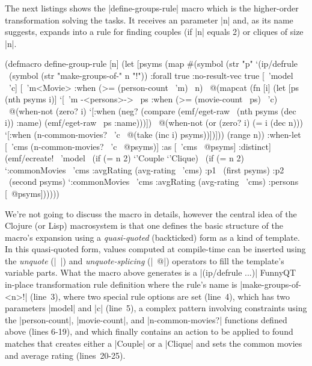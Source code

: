 \documentclass[submission]{eptcs}
\newcommand{\code}{\clojureinline}
\begin{document}
The next listings shows the \code|define-groups-rule| macro which is the
higher-order transformation solving the tasks.  It receives an parameter
\code|n| and, as its name suggests, expands into a rule for finding couples (if
\code|n| equals 2) or cliques of size \code|n|.

\begin{clojurecode}
(defmacro define-group-rule [n]
  (let [psyms (map #(symbol (str "p" %
    `(ip/defrule ~(symbol (str "make-groups-of-" n "!"))
       {:forall true :no-result-vec true}
       [~'model ~'c]
       [~'m<Movie> :when (>= (person-count ~'m) ~n)
        ~@(mapcat (fn [i]
                    (let [ps (nth psyms i)]
                      `[~'m -<persons>-> ~ps
                        :when (>= (movie-count ~ps) ~'c)
                        ~@(when-not (zero? i)
                            `[:when (neg? (compare (emf/eget-raw ~(nth psyms (dec i)) :name)
                                                   (emf/eget-raw ~ps :name)))])
                        ~@(when-not (or (zero? i) (= i (dec n)))
                            `[:when (n-common-movies? ~'c ~@(take (inc i) psyms))])]))
                  (range n))
        :when-let [~'cms (n-common-movies? ~'c ~@psyms)]
        :as [~'cms ~@psyms]
        :distinct]
       (emf/ecreate! ~'model ~(if (= n 2) `'Couple `'Clique)
                     ~(if (= n 2)
                        `{:commonMovies ~'cms :avgRating (avg-rating ~'cms)
                          :p1 ~(first psyms) :p2 ~(second psyms)}
                        `{:commonMovies ~'cms :avgRating (avg-rating ~'cms)
                          :persons [~@psyms]})))))
\end{clojurecode}

We're not going to discuss the macro in details, however the central idea of
the Clojure (or Lisp) macrosystem is that one defines the basic structure of
the macro's expansion using a \emph{quasi-quoted} (backticked) form as a kind
of template.  In this quasi-quoted form, values computed at compile-time can be
inserted using the \emph{unquote} (\code|~|) and \emph{unquote-splicing}
(\code|~@|) operators to fill the template's variable parts.  What the macro
above generates is a \code|(ip/defrule ...)| FunnyQT in-place transformation
rule definition where the rule's name is \code|make-groups-of-<n>!| (line~3),
where two special rule options are set (line~4), which has two parameters
\code|model| and \code|c| (line~5), a complex pattern involving constraints
using the \code|person-count|, \code|movie-count|, and \code|n-common-movies?|
functions defined above (lines 6-19), and which finally contains an action to
be applied to found matches that creates either a \code|Couple| or a
\code|Clique| and sets the common movies and average rating (lines~20-25).
\end{document}
